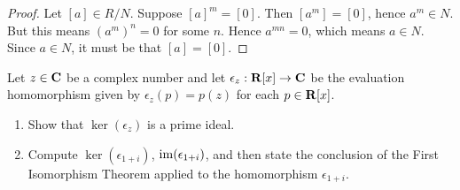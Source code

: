 \documentclass[10pt,twoside,openany]{memoir}
\begin{document}
    {\color{blue} \begin{proof}
        Let $[a] \in R/N$. Suppose $[a]^m = [0]$. Then $[a^m] = [0]$, hence $a^m \in N$. But this means $(a^m)^n = 0$ for some $n$. Hence $a^{mn} = 0$, which means $a \in N$. Since $a \in N$, it must be that $[a] = [0]$.
    \end{proof}}
\begin{problem}[S25, P3]
    Let $z \in \mathbf{C}$ be a complex number and let $\epsilon_z:\mathbf{R}[x] \rightarrow \mathbf{C}$ be the evaluation homomorphism given by $\epsilon_z(p) = p(z)$ for each $p \in \mathbf{R}[x]$.
    \begin{enumerate}[label = (\alph*),itemsep=1pt,topsep=3pt]
        \item Show that $\ker(\epsilon_z)$ is a prime ideal.
        \item Compute $\ker(\epsilon_{1+i})$, $\operatorname{im}(\epsilon_{1+i})$, and then state the conclusion of the First Isomorphism Theorem applied to the homomorphism $\epsilon_{1+i}$.
    \end{enumerate}
\end{problem}
\end{document}
